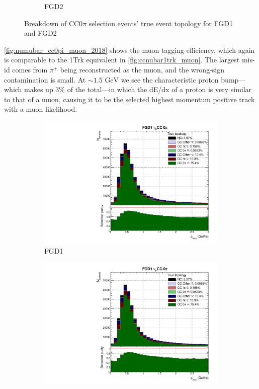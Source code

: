 \begin{figure}[h]
\begin{subfigure}[t]{0.49\textwidth}
		\caption{FGD2}
	\end{subfigure}
	\caption{Breakdown of \numubar CC0$\pi$ selection events' true event topology for FGD1 and FGD2 }
	\label{fig:numubar_cc0pi_topology_2018}
\end{figure}

\autoref{fig:numubar_cc0pi_muon_2018} shows the muon tagging efficiency, which again is comparable to the 1Trk equivalent in \autoref{fig:ccnubar1trk_muon}. The largest mis-id comes from $\pi^+$ being reconstructed as the muon, and the wrong-sign contamination is small. At $\sim1.5\text{ GeV}$ we see the characteristic proton bump---which makes up 3\% of the total---in which the dE/dx of a proton is very similar to that of a muon, causing it to be the selected highest momentum positive track with a muon likelihood.
\begin{figure}[h]
	\begin{subfigure}[t]{0.49\textwidth}
		\includegraphics[width=\textwidth,page=14, trim={0mm 0mm 0mm 9mm}, clip]{figures/mach3/2018/Selection/2018_RedNDmatrix_rebin_verbose_may_noweights_diagnostics}
		\caption{FGD1}
	\end{subfigure}
	\begin{subfigure}[t]{0.49\textwidth}
		\includegraphics[width=\textwidth,page=20, trim={0mm 0mm 0mm 9mm}, clip]{figures/mach3/2018/Selection/2018_RedNDmatrix_rebin_verbose_may_noweights_diagnostics}

\end{subfigure}
\end{figure}
